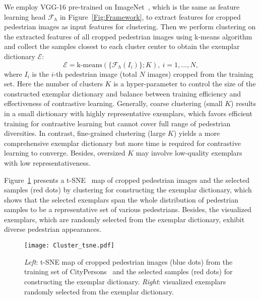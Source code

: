 \documentclass[journal]{IEEEtran}
\begin{document}
We employ VGG-16 pre-trained on ImageNet~\cite{deng2009imagenet}, which is the same as feature learning head $\mathcal{F}_h$ in Figure~\ref{Fig:Framework}, to extract features for cropped pedestrian images as input features for clustering. 
Then we perform clustering on the extracted features of all cropped pedestrian images using k-means algorithm~\cite{macqueen1967some} and collect the samples closest to each cluster center to obtain the exemplar dictionary $\mathcal{E}$:
\begin{equation}
    \mathcal{E} = \text{k-means}(\{\mathcal{F}_h(I_i)\};K), \ i= 1, \dots, N,
    \label{eqn:cluster1}
\end{equation}
where $I_i$ is the $i$-th pedestrian image (total $N$ images) cropped from the training set.
Here the number of clusters $K$ is a hyper-parameter to control the size of the constructed exemplar dictionary and balance between training efficiency and effectiveness of contrastive learning. 
Generally, coarse clustering (small $K$) results in a small dictionary with highly representative exemplars, which favors efficient training for contrastive learning but cannot cover full range of pedestrian diversities. In contrast, fine-grained clustering (large $K$) yields a more comprehensive exemplar dictionary but more time is required for contrastive learning to converge. Besides, oversized $K$ may involve low-quality exemplars with low representativeness.

Figure~\ref{Fig:exemplar_tsne} presents a t-SNE~\cite{van2008visualizing} map of cropped pedestrian images and the selected samples (red dots) by clustering for constructing the exemplar dictionary, which shows that the selected exemplars span the whole distribution of pedestrian samples to be a representative set of various pedestrians.  Besides, the visualized exemplars, which are randomly selected from the exemplar dictionary, exhibit diverse pedestrian appearances.







\begin{figure}[!t]
\centering
    \texttt{[image: Cluster\_tsne.pdf]}
\caption{\emph{Left}: t-SNE map of cropped pedestrian images (blue dots) from the training set of CityPersons~\cite{zhang2017citypersons} and the selected samples (red dots) for constructing the exemplar dictionary. \emph{Right}: visualized exemplars randomly selected from the exemplar dictionary.}
\label{Fig:exemplar_tsne}
\end{figure}
\end{document}
